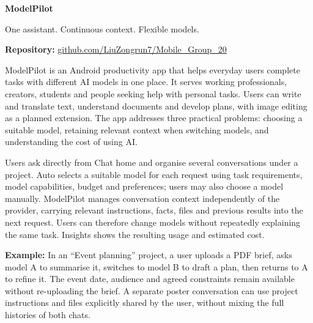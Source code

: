 \documentclass[10pt,a4paper]{article}
\newcommand{\sect}[2]{\par\vspace{6pt}{\sffamily\bfseries\fontsize{12.5}{15}\selectfont\color{ink}#1\enspace #2}\par\vspace{2pt}}
\begin{document}
\fontsize{10.5}{12.6}\selectfont
{\sffamily\bfseries\fontsize{27}{31}\selectfont\color{ink}ModelPilot}\par
{\sffamily\fontsize{12}{15}\selectfont\color{teal}One assistant. Continuous context. Flexible models.}\par
\textbf{Repository:} \href{https://github.com/LiuZongrun7/Mobile_Group_20}{github.com/LiuZongrun7/Mobile\_Group\_20}

\sect{1}{App idea and intended users}
ModelPilot is an Android productivity app that helps everyday users complete tasks with different AI models in one place. It serves working professionals, creators, students and people seeking help with personal tasks. Users can write and translate text, understand documents and develop plans, with image editing as a planned extension. The app addresses three practical problems: choosing a suitable model, retaining relevant context when switching models, and understanding the cost of using AI.

Users ask directly from Chat home and organise several conversations under a project. Auto selects a suitable model for each request using task requirements, model capabilities, budget and preferences; users may also choose a model manually. ModelPilot manages conversation context independently of the provider, carrying relevant instructions, facts, files and previous results into the next request. Users can therefore change models without repeatedly explaining the same task. Insights shows the resulting usage and estimated cost.

\textbf{Example:} In an ``Event planning'' project, a user uploads a PDF brief, asks model A to summarise it, switches to model B to draft a plan, then returns to A to refine it. The event date, audience and agreed constraints remain available without re-uploading the brief. A separate poster conversation can use project instructions and files explicitly shared by the user, without mixing the full histories of both chats.
\end{document}
